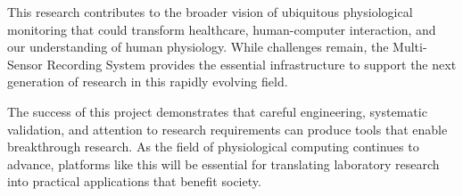 This research contributes to the broader vision of ubiquitous physiological monitoring that could transform healthcare, human-computer interaction, and our understanding of human physiology. While challenges remain, the Multi-Sensor Recording System provides the essential infrastructure to support the next generation of research in this rapidly evolving field.

The success of this project demonstrates that careful engineering, systematic validation, and attention to research requirements can produce tools that enable breakthrough research. As the field of physiological computing continues to advance, platforms like this will be essential for translating laboratory research into practical applications that benefit society.
